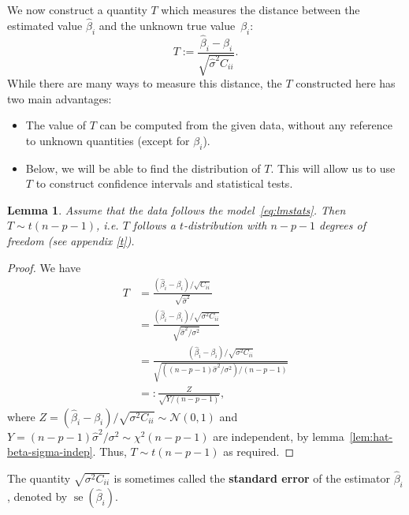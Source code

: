 \documentclass[
  a4paper,
]{article}
\newtheorem{lemma}{Lemma}[section]
\theoremstyle{definition}
\theoremstyle{definition}
\theoremstyle{definition}
\theoremstyle{definition}
\theoremstyle{remark}
\begin{document}
We now construct a quantity \(T\) which measures the distance between
the estimated value \(\hat\beta_i\) and the unknown true value~\(\beta_i\):
\begin{equation}
  T
  := \frac{\hat\beta_i - \beta_i}{\sqrt{\hat\sigma^2 C_{ii}}}. \label{eq:single-T}
\end{equation}
While there are many ways to measure this distance, the \(T\) constructed
here has two main advantages:

\begin{itemize}
\item
  The value of \(T\) can be computed from the given data, without
  any reference to unknown quantities (except for \(\beta_i\)).
\item
  Below, we will be able to find the distribution of \(T\). This will
  allow us to use \(T\) to construct confidence intervals and statistical
  tests.
\end{itemize}

\begin{lemma}
\protect\hypertarget{lem:beta-i-follows-t}{}\label{lem:beta-i-follows-t}Assume that the data follows the model~\eqref{eq:lmstats}.
Then \(T \sim t(n-p-1)\), \emph{i.e.} \(T\) follows a
\(t\)-distribution with \(n-p-1\) degrees of freedom (see appendix \ref{t}).
\end{lemma}

\begin{proof}
We have
\begin{align*}
  T
  &= \frac{(\hat\beta_i - \beta_i) / \sqrt{C_{ii}}}
      {\sqrt{\hat\sigma^2}} \\
  &= \frac{(\hat\beta_i - \beta_i) / \sqrt{\sigma^2 C_{ii}}}
      {\sqrt{\hat\sigma^2 / \sigma^2}} \\
  &= \frac{(\hat\beta_i - \beta_i) / \sqrt{\sigma^2 C_{ii}}}
      {\sqrt{((n - p - 1) \hat\sigma^2 / \sigma^2) / (n - p -1)}} \\
  &=: \frac{Z}{\sqrt{Y / (n - p - 1)}},
\end{align*}
where \(Z = (\hat\beta_i - \beta_i) / \sqrt{\sigma^2 C_{ii}} \sim \mathcal{N}(0,1)\)
and \(Y = (n - p - 1) \hat\sigma^2/\sigma^2 \sim \chi^2(n-p-1)\)
are independent, by lemma~\ref{lem:hat-beta-sigma-indep}.
Thus, \(T \sim t(n-p-1)\) as required.
\end{proof}

The quantity \(\sqrt{\sigma^2 C_{ii}}\) is sometimes called the
\textbf{standard error} of the estimator \(\hat\beta_i\), denoted by
\(\mathop{\mathrm{se}}(\hat\beta_i)\).
\end{document}
